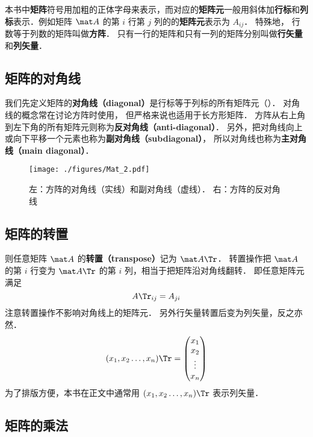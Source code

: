 

本书中\textbf{矩阵}符号用加粗的正体字母来表示，而对应的\textbf{矩阵元}一般用斜体加\textbf{行标}和\textbf{列标}表示．例如矩阵 $\mat A$ 的第 $i$ 行第 $j$ 列的的\textbf{矩阵元}表示为 $A_{ij}$． 特殊地， 行数等于列数的矩阵叫做\textbf{方阵}． 只有一行的矩阵和只有一列的矩阵分别叫做\textbf{行矢量}和\textbf{列矢量}．

\subsection{矩阵的对角线}
我们先定义矩阵的\textbf{对角线（diagonal）}是行标等于列标的所有矩阵元（）． 对角线的概念常在讨论方阵时使用， 但严格来说也适用于长方形矩阵． 方阵从右上角到左下角的所有矩阵元则称为\textbf{反对角线（anti-diagonal）}． 另外，把对角线向上或向下平移一个元素也称为\textbf{副对角线（subdiagonal）}， 所以对角线也称为\textbf{主对角线（main diagonal）}．

\begin{figure}[ht]
\centering
\texttt{[image: ./figures/Mat\_2.pdf]}
\caption{左：方阵的对角线（实线）和副对角线（虚线）． 右：方阵的反对角线} \label{Mat_fig2}
\end{figure}

\subsection{矩阵的转置}
则任意矩阵 $\mat A$ 的\textbf{转置（transpose）}记为 $\mat A\Tr$． 转置操作把 $\mat A$ 的第 $i$ 行变为 $\mat A\Tr$ 的第 $i$ 列，相当于把矩阵沿对角线翻转． 即任意矩阵元满足
\begin{equation}\label{Mat_eq3}
A\Tr_{ij} = A_{ji}
\end{equation}
注意转置操作不影响对角线上的矩阵元． 另外行矢量转置后变为列矢量，反之亦然．
\begin{equation}\label{Mat_eq2}
(x_1,x_2 \dots, x_n)\Tr = \begin{pmatrix} x_1\\x_2\\ \vdots\\x_n \end{pmatrix}
\end{equation}
为了排版方便，本书在正文中通常用 $(x_1,x_2 \dots, x_n)\Tr$ 表示列矢量．

\subsection{矩阵的乘法}

